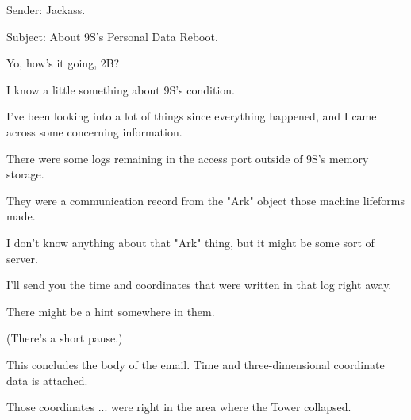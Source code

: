 \begin{play}
  Sender: Jackass.

  Subject: About 9S's Personal Data Reboot.

  Yo, how's it going, 2B?

  I know a little something about 9S's condition.

  I've been looking into a lot of things since everything happened, and I came across some concerning information.

  There were some logs remaining in the access port outside of 9S's memory storage.

  They were a communication record from the "Ark" object those machine lifeforms made.

  I don't know anything about that "Ark" thing, but it might be some sort of server.

  I'll send you the time and coordinates that were written in that log right away.

  There might be a hint somewhere in them.

(There's a short pause.)

  This concludes the body of the email. Time and three-dimensional coordinate data is attached.

  Those coordinates ... were right in the area where the Tower collapsed.
	
	
	
\end{play}
